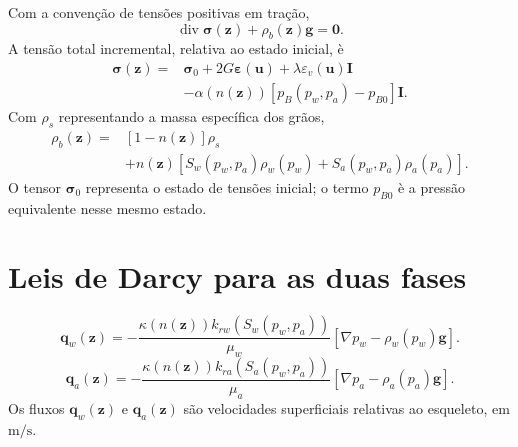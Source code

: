 \documentclass[11pt,a4paper]{article}
\numberwithin{equation}{section}
\newcommand{\Div}{\operatorname{div}}
\newcommand{\Id}{\mathbf I}
\begin{document}
Com a conven\c{c}\~ao de tens\~oes positivas em tra\c{c}\~ao,
\begin{equation}
\boxed{\Div\boldsymbol\sigma(\mathbf z)+\rho_b(\mathbf z)\mathbf g=\mathbf0.}
\end{equation}
A tens\~ao total incremental, relativa ao estado inicial, \`e
\begin{equation}
\boxed{\begin{aligned}
\boldsymbol\sigma(\mathbf z)={}&\boldsymbol\sigma_0
+2G\boldsymbol\varepsilon(\mathbf u)
+\lambda\varepsilon_v(\mathbf u)\Id\\
&-\alpha(n(\mathbf z))
\left[p_B(p_w,p_a)-p_{B0}\right]\Id.
\end{aligned}}
\end{equation}
Com $\rho_s$ representando a massa espec\'ifica dos gr\~aos,
\begin{equation}
\boxed{\begin{aligned}
\rho_b(\mathbf z)={}&[1-n(\mathbf z)]\rho_s\\
&+n(\mathbf z)\left[
S_w(p_w,p_a)\rho_w(p_w)+S_a(p_w,p_a)\rho_a(p_a)
\right].
\end{aligned}}
\end{equation}
O tensor $\boldsymbol\sigma_0$ representa o estado de tens\~oes inicial;
o termo $p_{B0}$ \`e a press\~ao equivalente nesse mesmo estado.

\section{Leis de Darcy para as duas fases}

\begin{equation}
\boxed{\mathbf q_w(\mathbf z)=
-\frac{\kappa(n(\mathbf z))k_{rw}(S_w(p_w,p_a))}{\mu_w}
\left[\nabla p_w-\rho_w(p_w)\mathbf g\right].}
\end{equation}
\begin{equation}
\boxed{\mathbf q_a(\mathbf z)=
-\frac{\kappa(n(\mathbf z))k_{ra}(S_a(p_w,p_a))}{\mu_a}
\left[\nabla p_a-\rho_a(p_a)\mathbf g\right].}
\end{equation}
Os fluxos $\mathbf q_w(\mathbf z)$ e $\mathbf q_a(\mathbf z)$ s\~ao
velocidades superficiais relativas ao esqueleto, em $\mathrm{m/s}$.
\end{document}
